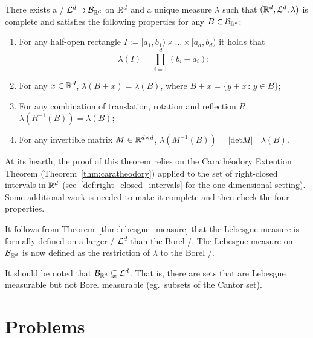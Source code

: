 \begin{theorem}\label{thm:lebesgue_measure}
There exists a \sigalg/ $\mathcal L^d \supset \mathcal B_{\mathbb R^d}$ on $\mathbb R^d$ and a unique measure $\lambda$ such that $(\mathbb R^d, \mathcal L^d, \lambda)$ is complete and satisfies the following properties for any $B \in \mathcal B_{\mathbb R^d}$:
\begin{enumerate}
\item For any half-open rectangle $I := [a_1, b_1) \times \dots \times [a_d, b_d)$ it holds that 
	\[
		\lambda(I) = \prod_{i = 1}^d (b_i-a_i);
	\]
\item For any $x \in \mathbb R^d$, $\lambda(B+x) = \lambda(B)$, where $B + x = \{y+x \, : \, y \in B\}$;
\item For any combination of translation, rotation and reflection $R$, $\lambda(R^{-1}(B)) = \lambda(B)$;
\item For any invertible matrix $M \in \mathbb R^{d \times d}$, $\lambda(M^{-1}(B)) = |\mathrm{det} M|^{-1} \lambda(B)$.
\end{enumerate}
\end{theorem}

At its hearth, the proof of this theorem relies on the Carath\'{e}odory Extention Theorem (Theorem~\ref{thm:caratheodory}) applied to the set of right-closed intervals in $\mathbb R^d$ (see~\eqref{def:right_closed_intervals} for the one-dimensional setting). Some additional work is needed to make it complete and then check the four properties. 


It follows from Theorem~\ref{thm:lebesgue_measure} that the Lebesgue measure is formally defined on a larger \sigalg/ $\mathcal L^d$ than the Borel \sigalg/. 
The Lebesgue measure on $\mathcal B_{\mathbb R^d}$ is now defined as the restriction of $\lambda$ to the Borel \sigalg/. 

\begin{remark}
It should be noted that $\mathcal B_{\mathbb R^d} \subsetneq \mathcal L^d$. That is, there are sets that are Lebesgue measurable but not Borel measurable (eg.\ subsets of the Cantor set).
\end{remark}

\section{Problems}

